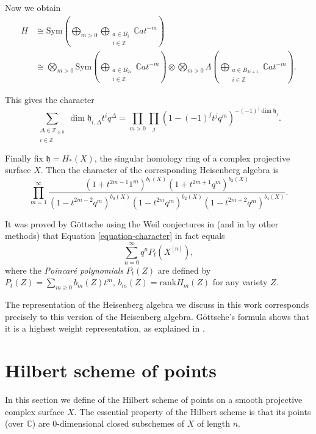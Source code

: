 Now we obtain
$$
\begin{aligned}
H&\cong
\text{Sym}\left(\bigoplus_{m>0}\bigoplus
_{\substack{a \in B_i \\ i \in \mathbb{Z}}}
\mathbb{C}at^{-m}\right)\\
&\cong
\bigotimes_{m>0}\text{Sym}\left(\bigoplus
_{\substack{a \in B_{2i} \\ i \in
\mathbb{Z}}}
\mathbb{C}at^{-m}\right)
\otimes\bigotimes_{m>0}
\Lambda\left(\bigoplus_{
\substack{a \in B_{2i+1} \\ i \in
\mathbb{Z}}}
\mathbb{C}at^{-m}\right).
\end{aligned}
$$

\noindent
This gives the character
$$
\sum_{\substack{\Delta\in \mathbb{Z}_{\geq
0}  \\ i \in \mathbb{Z}}}
\dim \mathfrak{h}_{i,\Delta}t^iq^\Delta
=\prod_{m>0}\prod_j(1-(-1)^jt^jq^m)^{-(-1)^j\dim \mathfrak{h}_j}.
$$

\noindent
Finally fix $\mathfrak{h}=H_*(X)$, the
singular homology ring
of a complex projective surface $X$.
Then the character of the corresponding
Heisenberg algebra is
\begin{equation}
\label{equation-character}
\prod_{m=1}^\infty \frac{
(1+t^{2m-1}1^m)^{b_1(X)}
(1+t^{2m+1}q^m)^{b_3(X)}}
{(1-t^{2m-2}q^m)^{b_0(X)}
(1-t^{2m}q^m)^{b_2(X)}
(1-t^{2m+2}q^m)^{b_4(X)}}.
\end{equation}

\noindent
It was proved by Göttsche using the Weil
conjectures in \cite{Gottsche1990}
(and in \cite[Section
6.2]{Nakajima-lectures} by other methods)
that Equation \ref{equation-character}
in fact equals
$$
\sum_{n=0}^\infty q^nP_t(X^{[n]}),
$$
where the {\it Poincaré polynomials}
$P_t(Z)$ are defined by
$P_t(Z)=\sum_{m\geq 0}b_m(Z)t^m$,
$b_m(Z)=\text{rank}H_m(Z)$ for
any variety $Z$.

The representation
of the Heisenberg algebra we discuss in this
work corresponds
precisely to this version of the Heisenberg
algebra.
Göttsche's formula shows that it is a
highest weight representation,
as explained in \cite[Corollary
8.16]{Nakajima-lectures}.




\section{Hilbert scheme of points}
\label{section-hilbert-scheme}

\noindent
In this section we define
of the Hilbert scheme of points
on a smooth projective complex surface $X$.
The essential property of the Hilbert scheme
is that its points (over $\mathbb{C}$)
are 0-dimensional closed subschemes of $X$
of length $n$.

